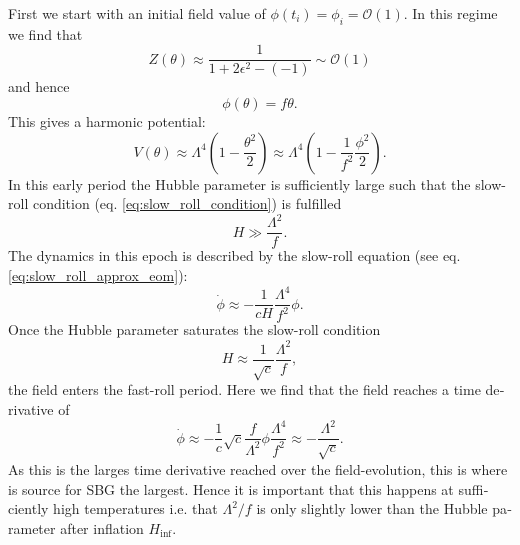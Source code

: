 \documentclass[master,       %
               twoside,        %
               BCOR10mm,       %
               english,ngerman, %
               ]{GAUBM}
\begin{document}
\begin{otherlanguage}{english}
First we start with an initial field value of $\phi(t_i) = \phi_i = \mathcal{O}(1)$.
In this regime we find that
\begin{equation}
	Z(\theta) \approx \frac{1}{1 + 2\epsilon^2 - (-1)} \sim \mathcal{O}(1)
\end{equation}
and hence
\begin{equation}
	\phi(\theta) = f \theta.
\end{equation}
This gives a harmonic potential:
\begin{equation}
	V(\theta) \approx \Lambda^4\left(1 - \frac{\theta^2}{2}\right) \approx \Lambda^4\left(1 - \frac{1}{f^2} \frac{\phi^2}{2}\right).
\end{equation}
In this early period the Hubble parameter is sufficiently large such that the slow-roll condition (eq. \eqref{eq:slow_roll_condition}) is fulfilled
\begin{equation}
	H \gg \frac{\Lambda^2}{f}.
\end{equation}
The dynamics in this epoch is described by the slow-roll equation (see eq. \eqref{eq:slow_roll_approx_eom}):
\begin{equation}
	\dot{\phi} \approx - \frac{1}{c H} \frac{\Lambda^4}{f^2} \phi.
\end{equation}
Once the Hubble parameter saturates the slow-roll condition
\begin{equation}
	H \approx \frac{1}{\sqrt{c}} \frac{\Lambda^2}{f},
\end{equation}
the field enters the fast-roll period.
Here we find that the field reaches a time derivative of
\begin{equation}
	\dot{\phi} \approx - \frac{1}{c} \sqrt{c} \frac{f}{\Lambda^2} \phi \frac{\Lambda^4}{f^2} \approx - \frac{\Lambda^2}{\sqrt{c}}.
\end{equation}
As this is the larges time derivative reached over the field-evolution, this is where is source for SBG the largest.
Hence it is important that this happens at sufficiently high temperatures i.e. that $\Lambda^2/f$ is only slightly lower than the Hubble parameter after inflation $H_\mathrm{inf}$.


\end{otherlanguage}
\end{document}
